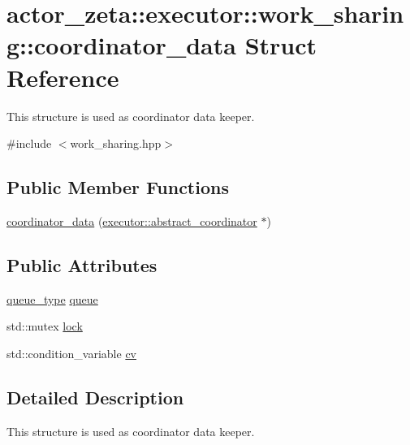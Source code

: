 \hypertarget{structactor__zeta_1_1executor_1_1work__sharing_1_1coordinator__data}{}\section{actor\+\_\+zeta\+:\+:executor\+:\+:work\+\_\+sharing\+:\+:coordinator\+\_\+data Struct Reference}
\label{structactor__zeta_1_1executor_1_1work__sharing_1_1coordinator__data}


This structure is used as coordinator data keeper.  




{\ttfamily \#include $<$work\+\_\+sharing.\+hpp$>$}

\subsection*{Public Member Functions}
\begin{DoxyCompactItemize}
\item 
\hyperlink{structactor__zeta_1_1executor_1_1work__sharing_1_1coordinator__data_afa3541d8688a1f8c0a0377771e3d0e60}{coordinator\+\_\+data} (\hyperlink{classactor__zeta_1_1executor_1_1abstract__coordinator}{executor\+::abstract\+\_\+coordinator} $\ast$)
\end{DoxyCompactItemize}
\subsection*{Public Attributes}
\begin{DoxyCompactItemize}
\item 
\hyperlink{classactor__zeta_1_1executor_1_1work__sharing_a4ed160584612bb4abf7e23ace3590801}{queue\+\_\+type} \hyperlink{structactor__zeta_1_1executor_1_1work__sharing_1_1coordinator__data_ac6dbe15cd908724d0e7e21fb232d2ed9}{queue}
\item 
std\+::mutex \hyperlink{structactor__zeta_1_1executor_1_1work__sharing_1_1coordinator__data_a968512a12d1e853c314092fe036a5731}{lock}
\item 
std\+::condition\+\_\+variable \hyperlink{structactor__zeta_1_1executor_1_1work__sharing_1_1coordinator__data_a0499bb938db7889fb4aa650c7baea21c}{cv}
\end{DoxyCompactItemize}


\subsection{Detailed Description}
This structure is used as coordinator data keeper. 

